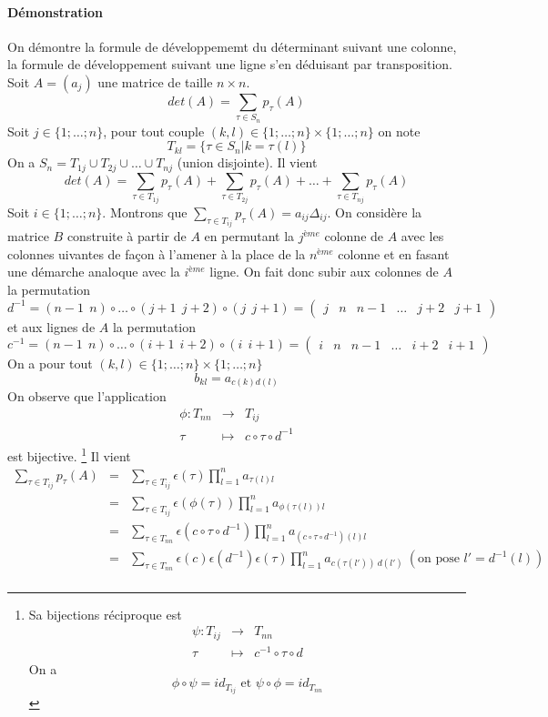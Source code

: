 \paragraph{Démonstration} On démontre la formule de développememt du déterminant suivant une colonne, la formule de développement suivant une ligne s'en déduisant par transposition. \\
Soit $A = (a_{j})$ une matrice de taille $n \times n$.
$$det(A) = \sum_{\tau \in S_n} p_{\tau}(A)$$
Soit $j \in \{1; \ldots; n \}$, pour tout couple $(k, l) \in  \{1; \ldots; n \}\times\{1; \ldots; n \}$ on note
$$T_{kl} = \{\tau \in S_n \vert k = \tau(l) \}$$
On a $S_n = T_{1j} \cup T_{2j} \cup \ldots \cup T_{nj}$ (union disjointe). Il vient
$$det(A) = \sum_{\tau \in T_{1j}} p_{\tau}(A) + \sum_{\tau \in T_{2j}} p_{\tau}(A) + \ldots + \sum_{\tau \in T_{nj}} p_{\tau}(A)$$
Soit $i \in \{1; \ldots; n\}$. Montrons que $\sum_{\tau \in T_{ij}} p_{\tau}(A) = a_{ij} \Delta_{ij}$. On considère la matrice $B$ construite à partir de $A$ en permutant la $j^{ème}$ colonne de $A$ avec les colonnes uivantes de façon à l'amener à la place de la $n^{ème}$ colonne et en fasant une démarche analoque avec la $i^{ème}$ ligne. On fait donc subir aux colonnes de $A$ la permutation
$$d^{-1} = (n-1 ~~ n) \circ \ldots \circ (j+ 1 ~~ j + 2) \circ (j ~~ j+1) = \begin{pmatrix}j & n & n-1 & \ldots & j + 2 & j + 1\end{pmatrix}$$
et aux lignes de $A$ la permutation
$$c^{-1} = (n-1 ~~ n) \circ \ldots \circ (i+ 1 ~~ i + 2) \circ (i ~~ i+1) = \begin{pmatrix}i & n & n-1 & \ldots & i + 2 & i + 1\end{pmatrix}$$
On a pour tout $(k, l) \in \{1; \ldots; n \}\times\{1; \ldots; n \}$
$$b_{kl} = a_{c(k)d(l)}$$
On observe que l'application
\begin{eqnarray*}
  \phi: T_{n n} &\rightarrow& T_{ij} \\
  \tau &\mapsto& c \circ \tau \circ d^{-1}
\end{eqnarray*}
est bijective. \footnote{Sa bijections réciproque est
\begin{eqnarray*}
  \psi: T_{ij} &\rightarrow& T_{n n} \\
  \tau &\mapsto& c^{-1} \circ \tau \circ d
\end{eqnarray*}
On a
$$\phi \circ \psi = id_{T_{ij}} \text{ et } \psi \circ \phi = id_{T_{n n}}$$}
Il vient
\begin{eqnarray*}
  \sum_{\tau \in T_{ij}} p_{\tau}(A) &=& \sum_{\tau \in T_{ij}} \epsilon(\tau) \prod_{l=1}^{n} a_{\tau(l) l} \\
    &=& \sum_{\tau \in T_{ij}} \epsilon(\phi(\tau)) \prod_{l=1}^{n} a_{\phi(\tau(l)) l} \\
    &=& \sum_{\tau \in T_{n n}} \epsilon(c \circ \tau \circ d^{-1}) \prod_{l=1}^{n} a_{(c \circ \tau \circ d^{-1})(l) l} \\
    &=& \sum_{\tau \in T_{n n}} \epsilon(c) \epsilon(d^{-1}) \epsilon(\tau) \prod_{l=1}^{n} a_{c(\tau(l')) ~ d(l')} ~ (\text{on pose } l' = d^{-1}(l))\\
\end{eqnarray*}
